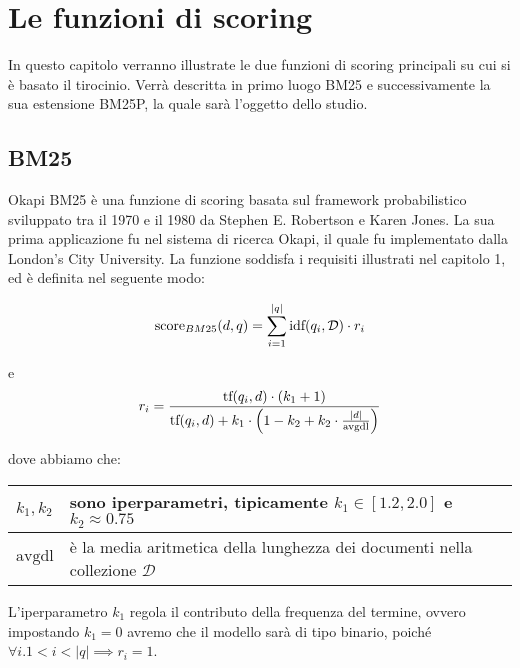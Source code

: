 \chapter{Le funzioni di scoring}
In questo capitolo verranno illustrate le due funzioni di scoring principali su cui si è basato il tirocinio.
Verrà descritta in primo luogo BM25 e successivamente la sua estensione BM25P, la quale sarà l'oggetto
dello studio.

\section{BM25}
Okapi BM25 è una funzione di scoring basata sul framework probabilistico sviluppato tra il 1970 e il 1980
da Stephen E. Robertson e Karen Jones. La sua prima applicazione fu nel sistema di ricerca Okapi, il quale
fu implementato dalla London's City University. La funzione soddisfa i requisiti illustrati nel capitolo 1, ed è definita
nel seguente modo:

\begin{definizione}\label{def:bm25}
	$$
	\text{score}_{BM25}(d, q) = \sum_{i=1}^{|q|} \text{idf}(q_i, \mathcal{D}) \cdot r_i
	$$
	
	e
	$$
	r_i = \frac{
		\text{tf}(q_i, d) \cdot (k_1 +1)
	}{
		\text{tf}(q_i, d) + k_1 \cdot \left(1-k_2 + k_2 \cdot \frac{\left|d\right|}{\text{avgdl}}\right)
	}
	$$
	
	
	dove abbiamo che:
	
	\begin{table}[h]
	\begin{tabular}{|l|p{110mm}|}
		\hline
		$k_1, k_2$ &  sono iperparametri, \newline tipicamente $k_1 \in\left[1.2, 2.0\right]$ e $k_2 \approx 0.75$  \\
		\hline
		$\text{avgdl}$ &  è la media aritmetica della lunghezza dei documenti nella collezione $\mathcal{D}$  \\
		\hline
	\end{tabular}
\end{table}
\end{definizione}


L'iperparametro $k_1$ regola il contributo della frequenza del termine, ovvero impostando $k_1 = 0$ avremo
che il modello sarà di tipo binario, poiché $\forall i . 1 < i < \left|q\right| \implies r_i = 1$.


